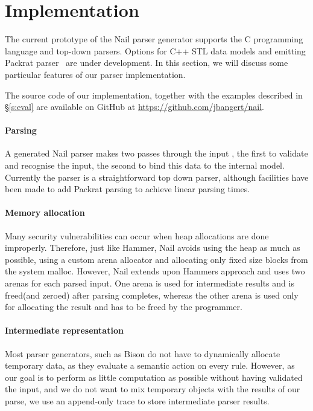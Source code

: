 \section{Implementation}
\label{s:impl}

The current prototype of the Nail parser generator supports the C programming
language and top-down parsers. Options for C++ STL data models and emitting
Packrat parser~\cite{packrat-parsing:icfp02} are under development. In
this section, we will discuss some particular features of our parser
implementation.

The source code of our implementation, together with the examples described in
\S\ref{s:eval} are available on GitHub at \url{https://github.com/jbangert/nail}.

\paragraph{Parsing}
A generated Nail parser makes two passes through the input , the first to
validate and recognise the input, the second to bind this data to the internal
model. Currently the parser is a straightforward top down parser, although
facilities have been made to add Packrat parsing to achieve linear parsing
times.
\paragraph{Memory allocation}
Many security vulnerabilities can occur when heap allocations are done
improperly. Therefore, just like Hammer, Nail avoids using the heap as much as
possible, using a custom arena allocator and allocating only fixed size blocks
from the system malloc. However, Nail extends upon Hammers approach and uses two
arenas for each parsed input. One arena is used for intermediate results and is
freed(and zeroed) after parsing completes, whereas the other arena is used only
for allocating the result and has to be freed by the programmer.

\paragraph{Intermediate representation}
Most parser generators, such as Bison do not have to dynamically allocate
temporary data, as they evaluate a semantic action on every rule. However, as
our goal is to perform as little computation as possible without having
validated the input, and we do not want to mix temporary objects with the
results of our parse, we use an append-only trace to store intermediate parser
results. 

